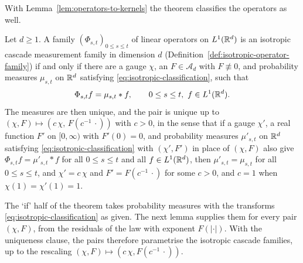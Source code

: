 With Lemma~\ref{lem:operators-to-kernels} the theorem classifies the operators as well.

\begin{corollary}\label{cor:isotropic-classification-operators}
Let $d \ge 1$. A family $(\Phi_{s,t})_{0 \le s \le t}$ of linear operators on $L^1(\mathbb{R}^d)$ is an
isotropic cascade measurement family in dimension $d$ (Definition~\ref{def:isotropic-operator-family}) if and
only if there are a gauge $\chi$, an $F \in \mathcal{A}_d$ with $F \not\equiv 0$, and probability
measures $\mu_{s,t}$ on $\mathbb{R}^d$ satisfying \ref{eq:isotropic-classification}, such that
\[
  \Phi_{s,t}f = \mu_{s,t} * f, \qquad 0 \le s \le t,\ f \in L^1(\mathbb{R}^d) .
\]
The measures are then unique, and the pair is unique up to
$(\chi,F) \mapsto (c\,\chi,\,F(c^{-1}\,\cdot))$ with $c > 0$, in the sense that if a gauge $\chi'$,
a real function $F'$ on $[0,\infty)$ with $F'(0) = 0$, and probability measures $\mu'_{s,t}$ on
$\mathbb{R}^d$ satisfying \ref{eq:isotropic-classification} with $(\chi', F')$ in place of $(\chi, F)$
also give $\Phi_{s,t}f = \mu'_{s,t} * f$ for all $0 \le s \le t$ and all $f \in L^1(\mathbb{R}^d)$, then
$\mu'_{s,t} = \mu_{s,t}$ for all $0 \le s \le t$, and $\chi' = c\,\chi$ and
$F' = F(c^{-1}\,\cdot)$ for some $c > 0$, and $c = 1$ when $\chi(1) = \chi'(1) = 1$.
\end{corollary}

The `if' half of the theorem
takes probability measures with the transforms \ref{eq:isotropic-classification} as given. The
next lemma supplies them for every pair $(\chi, F)$, from the residuals of the law with exponent
$F(|\cdot|)$. With the uniqueness clause, the pairs therefore parametrise the isotropic cascade
families, up to the rescaling $(\chi,F) \mapsto (c\,\chi, F(c^{-1}\,\cdot))$.

